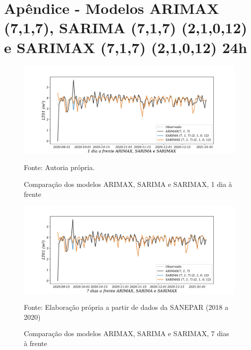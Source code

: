 
\section{Ap\^endice - Modelos ARIMAX (7,1,7), SARIMA (7,1,7) (2,1,0,12) e SARIMAX (7,1,7) (2,1,0,12) 24h}\label{sec:arimaxsarimasarimax24}

\begin{figure}[H]
	\centering
	\caption{Comparação dos modelos ARIMAX, SARIMA e SARIMAX, 1 dia à frente }
	\label{fig:1-ARIMAX-SARIMA-SARIMAX24}
	\includegraphics[width=1\linewidth]{Apendices/Figuras/modelagem-24h/1-ARIMAX-SARIMA-SARIMAX}
	
	Fonte: Autoria própria.
\end{figure}

\begin{figure}[H]
	\centering
	\caption{Comparação dos modelos ARIMAX, SARIMA e SARIMAX, 7 dias à frente }
	\label{fig:10-ARIMAX-SARIMA-SARIMAX24}
	\includegraphics[width=1\linewidth]{Apendices/Figuras/modelagem-24h/7-ARIMAX-SARIMA-SARIMAX}
	
Fonte: Elaboração própria a partir de dados da SANEPAR (2018 a 2020)
\end{figure}


